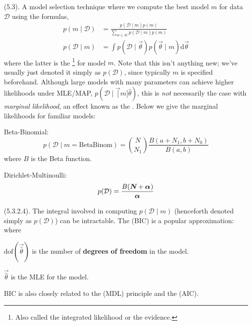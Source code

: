 \documentclass[11pt]{article}
\begin{document}
\myspace
\p {} (5.3). A model selection technique where we compute the best model $m$ for data $\mathcal D$ using the formulas,
\begin{align}
	p(m \mid \mathcal D)
		&= \frac{  p(\mathcal D \mid m) p(m)  }{ \sum_{m \in \mathcal M} p(\mathcal D \mid m) p(m)  } \\
	p(\mathcal D \mid m) 
		&= \int p(\mathcal D \mid \vec\theta) p(\vec\theta \mid m) \mathrm{d}\vec\theta
\end{align}
where the latter is the \footnote{Also called the integrated likelihood or the evidence.} for model $m$. Note that this isn't anything new; we've usually just denoted it simply as $p(\mathcal D)$, since typically $m$ is specified beforehand. Although large models with many parameters can achieve higher likelihoods under MLE/MAP, $p(\mathcal D \mid \vec[m]{\hat\theta})$, this is \textit{not} necessarily the case with \textit{marginal likelihood}, an effect known as the . Below we give the marginal likelihoods for familiar models:
\begin{compactitem}
	\item Beta-Binomial: $$p(\mathcal D \mid m{=}\text{BetaBinom}) = {N \choose N_1} \frac{ B(a + N_1, b + N_0) }{ B(a, b)  }$$ where $B$ is the Beta function.
	
	\item Dirichlet-Multinoulli:
	$$
		p(\mathcal D) = \frac{B(\bm{N}_{} + \bm{\alpha}_{})}{\bm{\alpha}_{}}
	$$
\end{compactitem}

\myspace
\p {} (5.3.2.4). The integral involved in computing $p(\mathcal D \mid m)$ (henceforth denoted simply as $p(\mathcal D)$) can be intractable. The  (BIC) is a popular approximation:
where
\begin{compactitem}
	\item $\text{dof}(\vec{\hat{\theta}})$ is the number of \textbf{degrees of freedom} in the model.
	
	\item $\vec{\hat\theta}$ is the MLE for the model. 
\end{compactitem}
BIC is also closely related to the  (MDL) principle and the  (AIC). 
\end{document}
